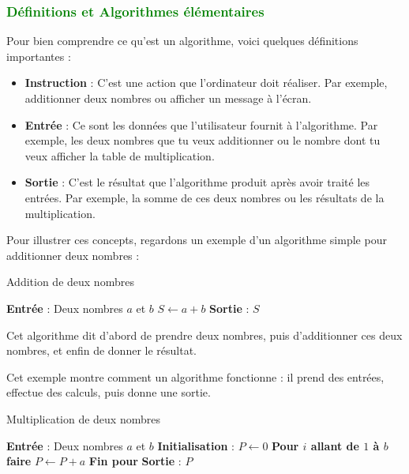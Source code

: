 \documentclass{article}
\begin{document}
\subsubsection{\textcolor{green}{Définitions et Algorithmes élémentaires}}

Pour bien comprendre ce qu'est un algorithme, voici quelques définitions importantes :

\begin{tcolorbox}[colback=red!10!white, colframe=red!75!black, title=\textcolor{white}{Définitions}]
\begin{itemize}
    \item \textbf{Instruction} : C'est une action que l'ordinateur doit réaliser. Par exemple, additionner deux nombres ou afficher un message à l'écran.
    \item \textbf{Entrée} : Ce sont les données que l'utilisateur fournit à l'algorithme. Par exemple, les deux nombres que tu veux additionner ou le nombre dont tu veux afficher la table de multiplication.
    \item \textbf{Sortie} : C'est le résultat que l'algorithme produit après avoir traité les entrées. Par exemple, la somme de ces deux nombres ou les résultats de la multiplication.
\end{itemize}
\end{tcolorbox}

Pour illustrer ces concepts, regardons un exemple d'un algorithme simple pour additionner deux nombres :

\begin{tcolorbox}[colback=orange!10!white, colframe=orange!75!black, title=\textcolor{white}{Exemple d'Addition}]
\begin{algorithm}[H]
\caption{Addition de deux nombres}
\begin{algorithmic}[1]
\State \textbf{Entrée} : Deux nombres \( a \) et \( b \)
\State \( S \gets a + b \)
\State \textbf{Sortie} : \( S \)
\end{algorithmic}
\end{algorithm}
Cet algorithme dit d'abord de prendre deux nombres, puis d'additionner ces deux nombres, et enfin de donner le résultat.
\end{tcolorbox}

Cet exemple montre comment un algorithme fonctionne : il prend des entrées, effectue des calculs, puis donne une sortie.


\begin{tcolorbox}[colback=orange!10!white, colframe=orange!75!black, title=\textcolor{white}{Exemple de Multiplication}]
\begin{algorithm}[H]
\caption{Multiplication de deux nombres}
\begin{algorithmic}[1]
\State \textbf{Entrée} : Deux nombres \( a \) et \( b \)
\State \textbf{Initialisation} : \( P \gets 0 \)
\State \textbf{ Pour \( i \) allant de \(1 \) à \( b \)} \textbf{faire}  
    \State \( P \gets P + a \)
\State \textbf{Fin pour}
\State \textbf{Sortie} : \( P \)
\end{algorithmic}
\end{algorithm}
\end{tcolorbox}
\end{document}
